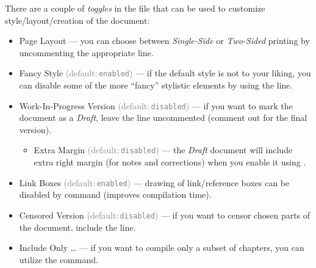 \begin{remark}[Toggles]
    There are a couple of \emph{toggles} in the  file that can be used to customize style/layout/creation of the document:
    \begin{itemize}
        \item \textsf{Page Layout} --- you can choose between \emph{Single-Side} or \emph{Two-Sided} printing by uncommenting the appropriate \macro{\documentclass} line.
        \item \textsf{Fancy Style} \textcolor{gray}{(default:\,\texttt{enabled})} --- if the default style is not to your liking, you can disable some of the more \enquote{fancy} stylistic elements by using the \custommacro{\FANCYfalse} line.
        \item \textsf{Work-In-Progress Version} \textcolor{gray}{(default:\,\texttt{disabled})} --- if you want to mark the document as a \emph{Draft}, leave the \custommacro{\WIPtrue} line uncommented (comment out for the final version).
              \begin{itemize}
                  \item \textsf{Extra Margin} \textcolor{gray}{(default:\,\texttt{disabled})} --- the \emph{Draft} document will include extra right margin (for notes and corrections) when you enable it using \custommacro{\EXTRAMARGINtrue}.
              \end{itemize}
        \item \textsf{Link Boxes} \textcolor{gray}{(default:\,\texttt{enabled})} --- drawing of link/reference boxes can be disabled by \custommacro{\LINKBOXESfalse} command (improves compilation time).
        \item \textsf{Censored Version} \textcolor{gray}{(default:\,\texttt{disabled})} --- if you want to censor chosen parts of the document, include the \custommacro{\CENSORtrue} line.
        \item \textsf{Include Only \ldots{}} --- if you want to compile only a subset of chapters, you can utilize the  command. \qedhere*
    \end{itemize}
\end{remark}

